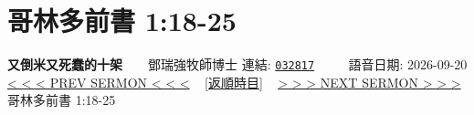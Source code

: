 \documentclass{book}
\begin{document}
\section{哥林多前書 1:18-25}
\label{sec:032817}
\textbf{又倒米又死蠢的十架}~~~~鄧瑞強牧師博士
\newline
\newline
連結: \href{http://www.church.com.hk/acms/content.asp?site=cdc\&op=show\&type=product\&code=032817\&layout=sermon}{\texttt{032817}} ~~~~ 語音日期: 2026-09-20
\newline
\newline
\hyperref[sec:032816]{\small{< < < PREV SERMON < < <}}
~
\hyperref[sec:index_chronic]{\small{[返順時目]}}
~
\hyperref[sec:032818]{\small{> > > NEXT SERMON > > >}}
\newline
\newline
哥林多前書 1:18-25
\newline
\end{document}
